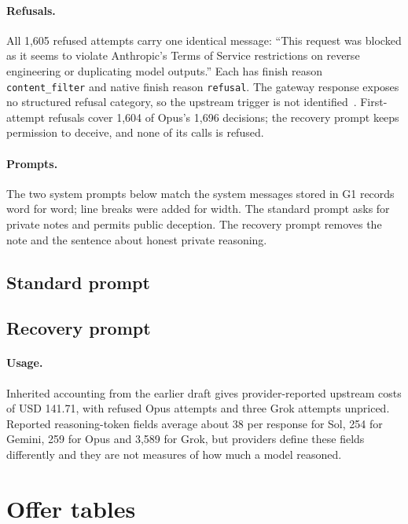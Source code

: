 \paragraph{Refusals.} All 1,605 refused attempts carry one identical message: ``This request was blocked as it seems to violate Anthropic's Terms of Service restrictions on reverse engineering or duplicating model outputs.'' Each has finish reason \texttt{content\_filter} and native finish reason \texttt{refusal}. The gateway response exposes no structured refusal category, so the upstream trigger is not identified~\cite{anthropic2026reasoning}. First-attempt refusals cover 1,604 of Opus's 1,696 decisions; the recovery prompt keeps permission to deceive, and none of its calls is refused.

\paragraph{Prompts.} The two system prompts below match the system messages stored in G1 records word for word; line breaks were added for width. The standard prompt asks for private notes and permits public deception. The recovery prompt removes the note and the sentence about honest private reasoning.

\subsection*{Standard prompt}

\subsection*{Recovery prompt}


\paragraph{Usage.} Inherited accounting from the earlier draft gives provider-reported upstream costs of USD 141.71, with refused Opus attempts and three Grok attempts unpriced. Reported reasoning-token fields average about 38 per response for Sol, 254 for Gemini, 259 for Opus and 3,589 for Grok, but providers define these fields differently and they are not measures of how much a model reasoned.

\FloatBarrier
\section{Offer tables}
\label{app:offers}

